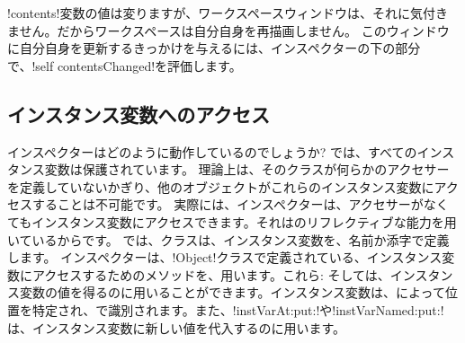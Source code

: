 \documentclass[a4paper,10pt,twoside]{book}
\begin{document}
\ct!contents!変数の値は変りますが、ワークスペースウィンドウは、それに気付きません。だからワークスペースは自分自身を再描画しません。
このウィンドウに自分自身を更新するきっかけを与えるには、インスペクターの下の部分で、\ct!self contentsChanged!を評価します。%

\subsection{インスタンス変数へのアクセス}

インスペクターはどのように動作しているのでしょうか?
\st{}では、すべてのインスタンス変数は保護されています。
理論上は、そのクラスが何らかのアクセサーを定義していないかぎり、他のオブジェクトがこれらのインスタンス変数にアクセスすることは不可能です。
実際には、インスペクターは、アクセサーがなくてもインスタンス変数にアクセスできます。それは\st{}のリフレクティブな能力を用いているからです。
\st{}では、クラスは、インスタンス変数を、名前か添字で定義します。
インスペクターは、\ct!Object!クラスで定義されている、インスタンス変数にアクセスするためのメソッドを、用います。これら: そしては、インスタンス変数の値を得るのに用いることができます。インスタンス変数は、によって位置を特定され、で識別されます。また、\ct!instVarAt:put:!や\ct!instVarNamed:put:!は、インスタンス変数に新しい値を代入するのに用います。%
\end{document}
